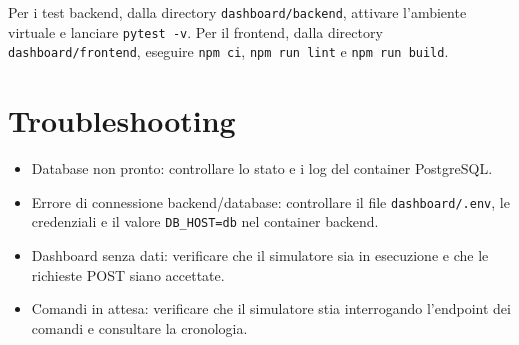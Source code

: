 Per i test backend, dalla directory \texttt{dashboard/backend}, attivare l'ambiente virtuale e lanciare \texttt{pytest -v}. Per il frontend, dalla directory \texttt{dashboard/frontend}, eseguire \texttt{npm ci}, \texttt{npm run lint} e \texttt{npm run build}.

\section{Troubleshooting}
\begin{itemize}
    \item Database non pronto: controllare lo stato e i log del container PostgreSQL.
    \item Errore di connessione backend/database: controllare il file \texttt{dashboard/.env}, le credenziali e il valore \texttt{DB\_HOST=db} nel container backend.
    \item Dashboard senza dati: verificare che il simulatore sia in esecuzione e che le richieste POST siano accettate.
    \item Comandi in attesa: verificare che il simulatore stia interrogando l'endpoint dei comandi e consultare la cronologia.
\end{itemize}

